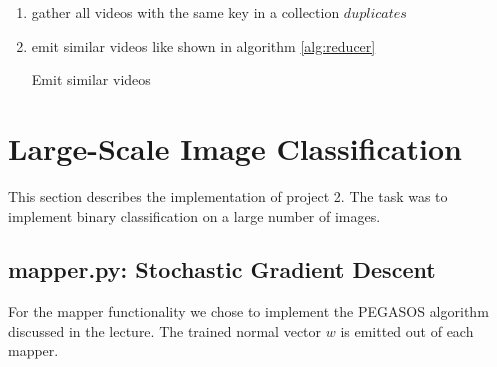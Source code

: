 \documentclass[a4paper, 11pt]{article}
\begin{document}
\begin{enumerate}

\item gather all videos with the same key in a collection $duplicates$
\item emit similar videos like shown in algorithm \autoref{alg:reducer}


\begin{algorithm}
\caption{Emit similar videos}\label{alg:reducer}
\begin{algorithmic} 








\ENDIF

\ENDIF

\ENDFOR

\ENDFOR

\end{algorithmic} 
\end{algorithm}



\end{enumerate}


\section{Large-Scale Image Classification}

This section describes the implementation of project 2. The task was to
implement binary classification on a large number of images.

\subsection{mapper.py: Stochastic Gradient Descent}

For the mapper functionality we chose to implement the PEGASOS
\cite{shalev2011pegasos} algorithm discussed in the lecture. The trained normal
vector $w$ is emitted out of each mapper.
\end{document}
